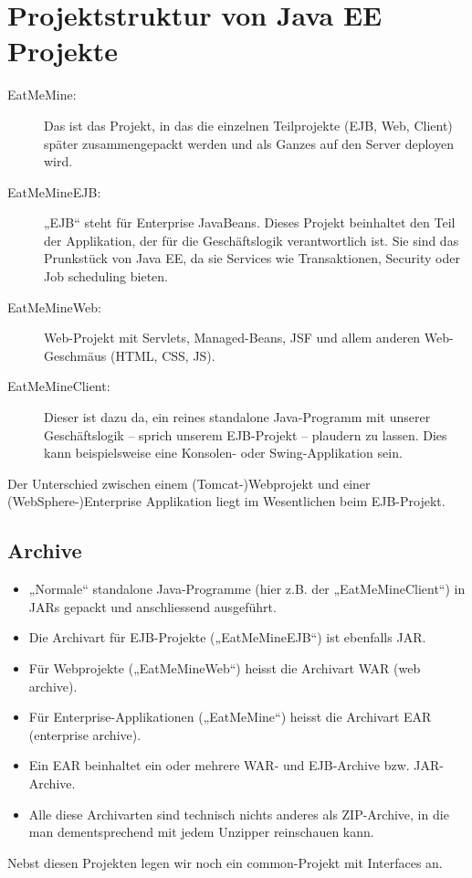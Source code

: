 \section{Projektstruktur von Java EE Projekte}

\begin{description}
	\item[EatMeMine:] Das ist das Projekt, in das die einzelnen Teilprojekte (EJB, Web, Client) später
	zusammengepackt werden und als Ganzes auf den Server deployen wird.
	
	\item[EatMeMineEJB:] „EJB“ steht für Enterprise JavaBeans. Dieses Projekt beinhaltet den Teil der
	Applikation, der für die Geschäftslogik verantwortlich ist. Sie sind das Prunkstück von Java EE, da
	sie Services wie Transaktionen, Security oder Job scheduling bieten.
	
	\item[EatMeMineWeb:] Web-Projekt mit Servlets, Managed-Beans, JSF und allem anderen Web-Geschmäus (HTML, CSS, JS).
	
	\item[EatMeMineClient:] Dieser ist dazu da, ein reines standalone Java-Programm mit unserer	Geschäftslogik – sprich unserem EJB-Projekt – plaudern zu lassen. Dies kann beispielsweise eine Konsolen- oder Swing-Applikation sein.
\end{description}

Der Unterschied zwischen einem (Tomcat-)Webprojekt und einer (WebSphere-)Enterprise Applikation liegt im Wesentlichen beim EJB-Projekt.

\subsection{Archive}

\begin{itemize}
	\item „Normale“ standalone Java-Programme (hier z.B. der „EatMeMineClient“) in JARs gepackt und anschliessend ausgeführt.
	\item Die Archivart für EJB-Projekte („EatMeMineEJB“) ist ebenfalls JAR.
	\item Für Webprojekte („EatMeMineWeb“) heisst die Archivart WAR (web archive).
	\item Für Enterprise-Applikationen („EatMeMine“) heisst die Archivart EAR (enterprise archive).
	\item Ein EAR beinhaltet ein oder mehrere WAR- und EJB-Archive bzw. JAR-Archive.
	\item Alle diese Archivarten sind technisch nichts anderes als ZIP-Archive, in die man dementsprechend mit jedem Unzipper reinschauen kann.
\end{itemize}
Nebst diesen Projekten legen wir noch ein common-Projekt mit Interfaces an.

